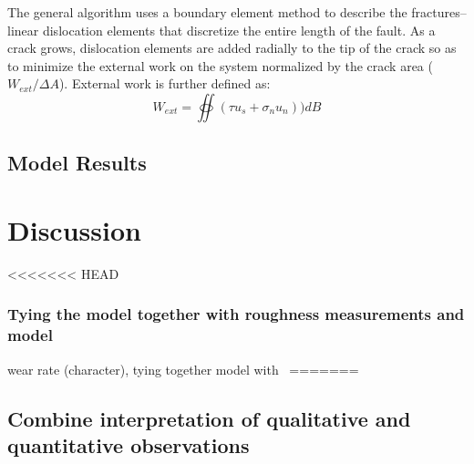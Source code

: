 \documentclass[12pt,a4paper]{article}
\begin{document}
\begin{itemize}
		The general algorithm uses a boundary element method to describe the fractures--linear dislocation elements that discretize the entire length of the fault. As a crack grows, dislocation elements are added radially to the tip of the crack so as to minimize the external work on the system normalized by the crack area ($W_{ext}/\Delta A$). External work is further defined as:
		\begin{equation}
		W_{ext} = \oiint (\tau u_s + \sigma_n u_n))dB
		\end{equation}
		
		
	
	\subsection{Model Results}

\section{Discussion}
<<<<<<< HEAD
	\subsubsection{Tying the model together with roughness measurements and model}
wear rate (character), tying together model with 
\
=======

	\subsection{Combine interpretation of qualitative and quantitative observations}





\end{itemize}
\end{document}
